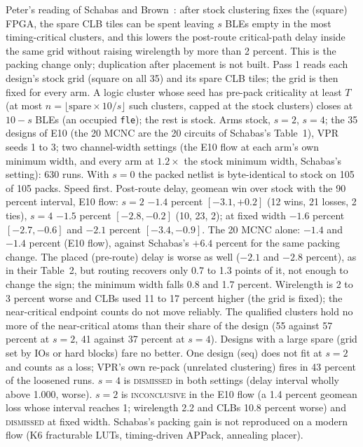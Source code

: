  Peter's reading of Schabas and Brown~\cite{schabas2003duplication}: after stock clustering fixes the (square) FPGA, the spare CLB tiles can be spent leaving $s$ BLEs empty in the most timing-critical clusters, and this lowers the post-route critical-path delay inside the same grid without raising wirelength by more than 2 percent. This is the packing change only; duplication after placement is not built. %
 Pass 1 reads each design's stock grid (square on all 35) and its spare CLB tiles; the grid is then fixed for every arm. A logic cluster whose seed has pre-pack criticality at least $T$ (at most $n=\lfloor \text{spare}\times 10/s\rfloor$ such clusters, capped at the stock clusters) closes at $10-s$ BLEs (an occupied \texttt{fle}); the rest is stock. Arms stock, $s=2$, $s=4$; the 35 designs of E10 (the 20 MCNC are the 20 circuits of Schabas's Table~1), VPR seeds 1 to 3; two channel-width settings (the E10 flow at each arm's own minimum width, and every arm at $1.2\times$ the stock minimum width, Schabas's setting): 630 runs. With $s=0$ the packed netlist is byte-identical to stock on 105 of 105 packs.
 Speed first. Post-route delay, geomean win over stock with the 90 percent interval, E10 flow: $s=2$ $-1.4$ percent $[-3.1,+0.2]$ (12 wins, 21 losses, 2 ties), $s=4$ $-1.5$ percent $[-2.8,-0.2]$ (10, 23, 2); at fixed width $-1.6$ percent $[-2.7,-0.6]$ and $-2.1$ percent $[-3.4,-0.9]$. The 20 MCNC alone: $-1.4$ and $-1.4$ percent (E10 flow), against Schabas's $+6.4$ percent for the same packing change. The placed (pre-route) delay is worse as well ($-2.1$ and $-2.8$ percent), as in their Table~2, but routing recovers only 0.7 to 1.3 points of it, not enough to change the sign; the minimum width falls 0.8 and 1.7 percent. Wirelength is 2 to 3 percent worse and CLBs used 11 to 17 percent higher (the grid is fixed); the near-critical endpoint counts do not move reliably. The qualified clusters hold no more of the near-critical atoms than their share of the design (55 against 57 percent at $s=2$, 41 against 37 percent at $s=4$). Designs with a large spare (grid set by IOs or hard blocks) fare no better. One design (seq) does not fit at $s=2$ and counts as a loss; VPR's own re-pack (unrelated clustering) fires in 43 percent of the loosened runs.
 $s=4$ is \textsc{dismissed} in both settings (delay interval wholly above 1.000, worse). $s=2$ is \textsc{inconclusive} in the E10 flow (a 1.4 percent geomean loss whose interval reaches 1; wirelength 2.2 and CLBs 10.8 percent worse) and \textsc{dismissed} at fixed width. Schabas's packing gain is not reproduced on a modern flow (K6 fracturable LUTs, timing-driven APPack, annealing placer).

